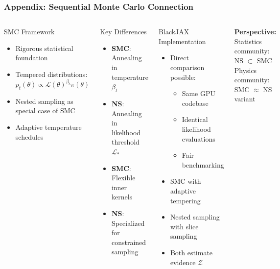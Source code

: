 \documentclass[aspectratio=169]{beamer}
\begin{document}
\appendix

\begin{frame}
    \frametitle{Appendix: Sequential Monte Carlo Connection}
    \begin{columns}
        \begin{block}{SMC Framework}
            \begin{itemize}
                \item Rigorous statistical foundation
                \item Tempered distributions: $p_t(\theta) \propto \mathcal{L}(\theta)^{\beta_t} \pi(\theta)$
                \item Nested sampling as special case of SMC
                \item Adaptive temperature schedules
            \end{itemize}
        \end{block}
        \begin{block}{Key Differences}
            \begin{itemize}
                \item \textbf{SMC}: Annealing in temperature $\beta_t$
                \item \textbf{NS}: Annealing in likelihood threshold $\mathcal{L}_*$
                \item \textbf{SMC}: Flexible inner kernels
                \item \textbf{NS}: Specialized for constrained sampling
            \end{itemize}
        \end{block}
        \begin{block}{BlackJAX Implementation}
            \begin{itemize}
                \item Direct comparison possible:
                    \begin{itemize}
                        \item Same GPU codebase
                        \item Identical likelihood evaluations
                        \item Fair benchmarking
                    \end{itemize}
                \item SMC with adaptive tempering
                \item Nested sampling with slice sampling
                \item Both estimate evidence $\mathcal{Z}$
            \end{itemize}
        \end{block}
        \vspace{10pt}
        \begin{center}
            \textbf{Perspective:}\\
            Statistics community: NS $\subset$ SMC\\
            Physics community: SMC $\approx$ NS variant
        \end{center}
    \end{columns}
\end{frame}
\end{document}
